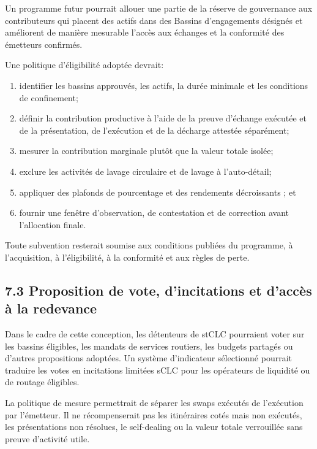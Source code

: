 \documentclass[11pt]{article}
\begin{document}
Un programme futur pourrait allouer une partie de la réserve de gouvernance aux contributeurs qui placent des actifs dans des Bassins d'engagements désignés et améliorent de manière mesurable l'accès aux échanges et la conformité des émetteurs confirmés.

Une politique d'éligibilité adoptée devrait:

\begin{enumerate}[leftmargin=*]
\item identifier les bassins approuvés, les actifs, la durée minimale et les conditions de confinement;
\item définir la contribution productive à l'aide de la preuve d'échange exécutée et de la présentation, de l'exécution et de la décharge attestée séparément;
\item mesurer la contribution marginale plutôt que la valeur totale isolée;
\item exclure les activités de lavage circulaire et de lavage à l'auto-détail;
\item appliquer des plafonds de pourcentage et des rendements décroissants ; et
\item fournir une fenêtre d'observation, de contestation et de correction avant l'allocation finale.
\end{enumerate}
Toute subvention resterait soumise aux conditions publiées du programme, à l'acquisition, à l'éligibilité, à la conformité et aux règles de perte.

\subsection*{7.3 Proposition de vote, d'incitations et d'accès à la redevance}

Dans le cadre de cette conception, les détenteurs de stCLC pourraient voter sur les bassins éligibles, les mandats de services routiers, les budgets partagés ou d'autres propositions adoptées. Un système d'indicateur sélectionné pourrait traduire les votes en incitations limitées sCLC pour les opérateurs de liquidité ou de routage éligibles.

La politique de mesure permettrait de séparer les swaps exécutés de l'exécution par l'émetteur. Il ne récompenserait pas les itinéraires cotés mais non exécutés, les présentations non résolues, le self-dealing ou la valeur totale verrouillée sans preuve d'activité utile.
\end{document}
